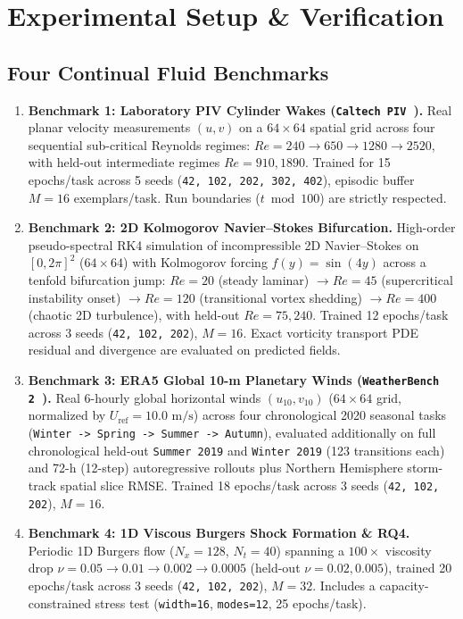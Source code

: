 \documentclass[11pt,a4paper]{article}
\begin{document}
\section{Experimental Setup \& Verification}

\subsection{Four Continual Fluid Benchmarks}

\begin{enumerate}
  \item \textbf{Benchmark 1: Laboratory PIV Cylinder Wakes (\texttt{Caltech PIV}~\cite{renn2026piv}).} Real planar velocity measurements $(u, v)$ on a $64 \times 64$ spatial grid across four sequential sub-critical Reynolds regimes: $Re = 240 \to 650 \to 1280 \to 2520$, with held-out intermediate regimes $Re = 910, 1890$. Trained for 15 epochs/task across 5 seeds (\texttt{42, 102, 202, 302, 402}), episodic buffer $M = 16$ exemplars/task. Run boundaries ($t \bmod 100$) are strictly respected.
  \item \textbf{Benchmark 2: 2D Kolmogorov Navier--Stokes Bifurcation.} High-order pseudo-spectral RK4 simulation of incompressible 2D Navier--Stokes on $[0, 2\pi]^2$ ($64 \times 64$) with Kolmogorov forcing $f(y) = \sin(4y)$ across a tenfold bifurcation jump: $Re = 20$ (steady laminar) $\to Re = 45$ (supercritical instability onset) $\to Re = 120$ (transitional vortex shedding) $\to Re = 400$ (chaotic 2D turbulence), with held-out $Re = 75, 240$. Trained 12 epochs/task across 3 seeds (\texttt{42, 102, 202}), $M = 16$. Exact vorticity transport PDE residual and divergence are evaluated on predicted fields.
  \item \textbf{Benchmark 3: ERA5 Global 10-m Planetary Winds (\texttt{WeatherBench 2}~\cite{rasp2024wb2}).} Real 6-hourly global horizontal winds $(u_{10}, v_{10})$ ($64 \times 64$ grid, normalized by $U_{\text{ref}} = 10.0\text{ m/s}$) across four chronological 2020 seasonal tasks (\texttt{Winter -> Spring -> Summer -> Autumn}), evaluated additionally on full chronological held-out \texttt{Summer 2019} and \texttt{Winter 2019} (123 transitions each) and 72-h (12-step) autoregressive rollouts plus Northern Hemisphere storm-track spatial slice RMSE. Trained 18 epochs/task across 3 seeds (\texttt{42, 102, 202}), $M = 16$.
  \item \textbf{Benchmark 4: 1D Viscous Burgers Shock Formation \& RQ4.} Periodic 1D Burgers flow ($N_x = 128$, $N_t = 40$) spanning a $100\times$ viscosity drop $\nu = 0.05 \to 0.01 \to 0.002 \to 0.0005$ (held-out $\nu = 0.02, 0.005$), trained 20 epochs/task across 3 seeds (\texttt{42, 102, 202}), $M = 32$. Includes a capacity-constrained stress test (\texttt{width=16}, \texttt{modes=12}, 25 epochs/task).
\end{enumerate}
\end{document}

